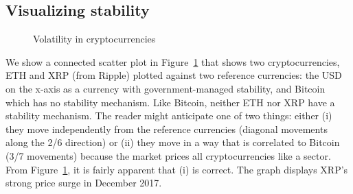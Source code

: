 
\subsection{Visualizing stability}\label{sec:stability}

\begin{figure}[t!]
	\centering
	\hfill
	\caption{Volatility in cryptocurrencies}
	\label{fig:fiatandcrypto}
\end{figure}

We show a connected scatter plot in Figure~\ref{fig:fiatandcrypto} that shows two cryptocurrencies, ETH and XRP (from Ripple) plotted against two reference currencies: the USD on the x-axis as a currency with government-managed stability, and Bitcoin which has no stability mechanism. Like Bitcoin, neither ETH nor XRP have a stability mechanism. The reader might anticipate one of two things: either (i) they move independently from the reference currencies (diagonal movements along the 2/6 direction) or (ii) they move in a way that is correlated to Bitcoin (3/7 movements) because the market prices all cryptocurrencies like a sector. From Figure~\ref{fig:fiatandcrypto}, it is fairly apparent that (i) is correct. The graph displays XRP's strong price surge in December 2017.


